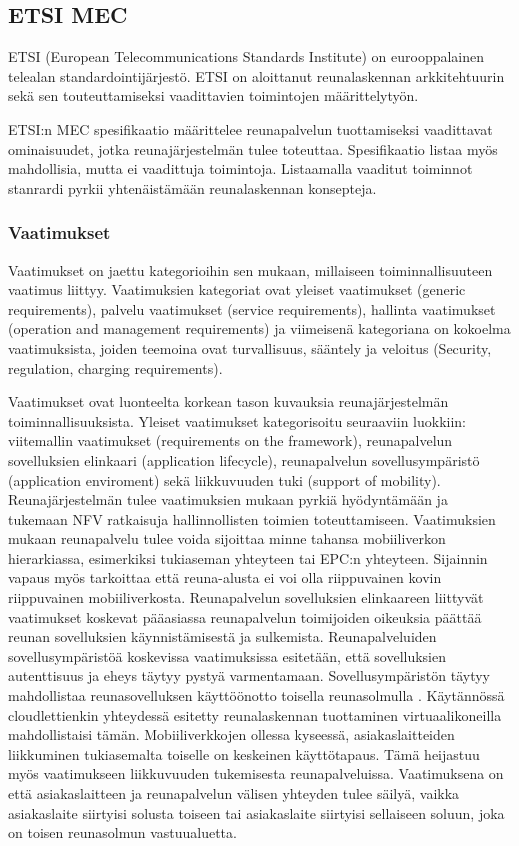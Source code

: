 \subsection{ETSI MEC} 
ETSI (European Telecommunications Standards Institute) on eurooppalainen telealan standardointijärjestö.
ETSI on aloittanut reunalaskennan arkkitehtuurin sekä sen touteuttamiseksi vaadittavien toimintojen määrittelytyön.

ETSI:n MEC spesifikaatio määrittelee reunapalvelun tuottamiseksi vaadittavat ominaisuudet, jotka reunajärjestelmän tulee toteuttaa.
Spesifikaatio listaa myös mahdollisia, mutta ei vaadittuja toimintoja. 
Listaamalla vaaditut toiminnot stanrardi pyrkii yhtenäistämään reunalaskennan konsepteja.  

\subsubsection{Vaatimukset} \label{etsi}
Vaatimukset on jaettu kategorioihin sen mukaan, millaiseen toiminnallisuuteen vaatimus liittyy.
Vaatimuksien kategoriat ovat yleiset vaatimukset (generic requirements), palvelu vaatimukset (service requirements), hallinta vaatimukset (operation and management requirements) ja viimeisenä kategoriana on kokoelma vaatimuksista, joiden teemoina ovat turvallisuus, sääntely ja veloitus (Security, regulation, charging requirements)\cite{etsitechreq}. 

Vaatimukset ovat luonteelta korkean tason kuvauksia reunajärjestelmän toiminnallisuuksista. Yleiset vaatimukset kategorisoitu seuraaviin luokkiin: viitemallin vaatimukset (requirements on the framework), reunapalvelun sovelluksien elinkaari (application lifecycle),
reunapalvelun sovellusympäristö (application enviroment) sekä liikkuvuuden tuki (support of mobility).
Reunajärjestelmän tulee vaatimuksien mukaan pyrkiä hyödyntämään ja tukemaan NFV ratkaisuja hallinnollisten toimien toteuttamiseen.
Vaatimuksien mukaan reunapalvelu tulee voida sijoittaa minne tahansa mobiiliverkon hierarkiassa, esimerkiksi tukiaseman yhteyteen tai EPC:n yhteyteen.
Sijainnin vapaus myös tarkoittaa että reuna-alusta ei voi olla riippuvainen kovin riippuvainen mobiiliverkosta. 
Reunapalvelun sovelluksien elinkaareen liittyvät vaatimukset koskevat pääasiassa reunapalvelun toimijoiden oikeuksia päättää reunan sovelluksien käynnistämisestä ja sulkemista.
Reunapalveluiden sovellusympäristöä koskevissa vaatimuksissa esitetään, että sovelluksien autenttisuus ja eheys täytyy pystyä varmentamaan. Sovellusympäristön täytyy mahdollistaa reunasovelluksen käyttöönotto toisella reunasolmulla \cite{etsitechreq}.
Käytännössä cloudlettienkin yhteydessä esitetty reunalaskennan tuottaminen virtuaalikoneilla mahdollistaisi tämän. 
Mobiiliverkkojen ollessa kyseessä, asiakaslaitteiden liikkuminen tukiasemalta toiselle on keskeinen käyttötapaus. Tämä heijastuu myös vaatimukseen liikkuvuuden tukemisesta reunapalveluissa.
Vaatimuksena on että asiakaslaitteen ja reunapalvelun välisen yhteyden tulee säilyä, vaikka asiakaslaite siirtyisi solusta toiseen tai asiakaslaite siirtyisi sellaiseen soluun, joka on toisen reunasolmun vastuualuetta.

